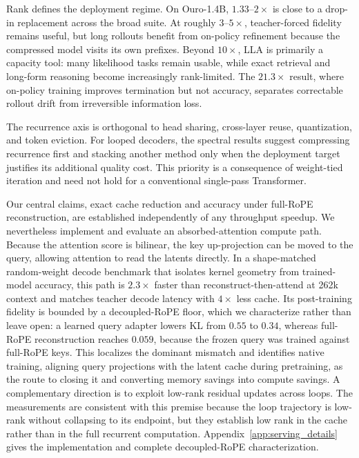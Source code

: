 \documentclass[10pt]{article}
\newcommand{\lla}{LLA}
\begin{document}
Rank defines the deployment regime. On Ouro-1.4B, $1.33$--$2\times$ is close to a drop-in replacement across the broad suite. At roughly $3$--$5\times$, teacher-forced fidelity remains useful, but long rollouts benefit from on-policy refinement because the compressed model visits its own prefixes. Beyond $10\times$, \lla{} is primarily a capacity tool: many likelihood tasks remain usable, while exact retrieval and long-form reasoning become increasingly rank-limited. The $21.3\times$ result, where on-policy training improves termination but not accuracy, separates correctable rollout drift from irreversible information loss.

The recurrence axis is orthogonal to head sharing, cross-layer reuse, quantization, and token eviction. For looped decoders, the spectral results suggest compressing recurrence first and stacking another method only when the deployment target justifies its additional quality cost. This priority is a consequence of weight-tied iteration and need not hold for a conventional single-pass Transformer.

Our central claims, exact cache reduction and accuracy under full-RoPE reconstruction, are established independently of any throughput speedup. We nevertheless implement and evaluate an absorbed-attention compute path. Because the attention score is bilinear, the key up-projection can be moved to the query, allowing attention to read the latents directly. In a shape-matched random-weight decode benchmark that isolates kernel geometry from trained-model accuracy, this path is $2.3\times$ faster than reconstruct-then-attend at 262k context and matches teacher decode latency with $4\times$ less cache. Its post-training fidelity is bounded by a decoupled-RoPE floor, which we characterize rather than leave open: a learned query adapter lowers KL from $0.55$ to $0.34$, whereas full-RoPE reconstruction reaches $0.059$, because the frozen query was trained against full-RoPE keys. This localizes the dominant mismatch and identifies native training, aligning query projections with the latent cache during pretraining, as the route to closing it and converting memory savings into compute savings. A complementary direction is to exploit low-rank residual updates across loops. The measurements are consistent with this premise because the loop trajectory is low-rank without collapsing to its endpoint, but they establish low rank in the cache rather than in the full recurrent computation. Appendix~\ref{app:serving_details} gives the implementation and complete decoupled-RoPE characterization.
\end{document}
